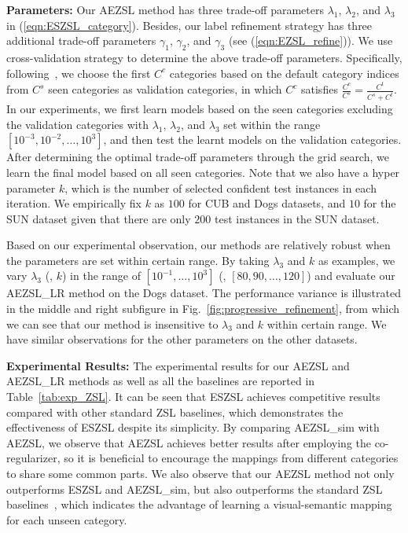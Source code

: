\documentclass[journal]{IEEEtran}
\begin{document}
\noindent\textbf{Parameters:} Our AEZSL method has three trade-off parameters $\lambda_1$, $\lambda_2$, and $\lambda_3$ in (\ref{eqn:ESZSL_category}). Besides, our label refinement strategy has three additional trade-off parameters $\gamma_1$, $\gamma_2$, and $\gamma_3$ (see (\ref{eqn:EZSL_refine})). We use cross-validation strategy to determine the above trade-off parameters.
Specifically, following~\cite{shojaee2016semi},  we choose the first $C^c$ categories based on the default category indices from $C^s$ seen categories as validation categories, in which $C^c$ satisfies $\frac{C^c}{C^s}=\frac{C^t}{C^s+C^t}$. In our experiments, we first learn models based on the seen categories excluding the validation categories with $\lambda_1$, $\lambda_2$, and $\lambda_3$ set within the range $[10^{-3},10^{-2},\ldots,10^{3}]$, and then test the learnt models on the validation categories. After determining the optimal trade-off parameters through the grid search, we learn the final model based on all seen categories.  
Note that we also have a hyper parameter $k$, which is the number of selected confident test instances in each iteration. We empirically fix $k$ as $100$ for CUB and Dogs datasets, and $10$ for the SUN dataset given that there are only $200$ test instances in the SUN dataset. 

Based on our experimental observation, our methods are relatively robust when the parameters are set within certain range. By taking $\lambda_3$ and $k$ as examples, we vary $\lambda_3$ (\resp, $k$) in the range of $[10^{-1},\ldots, 10^3]$ (\resp, $[80, 90, \ldots, 120]$) and evaluate our AEZSL\_LR method on the Dogs dataset. The performance variance is illustrated in the middle and right subfigure in Fig.~\ref{fig:progressive_refinement}, from which we can see that our method is insensitive to $\lambda_3$ and $k$ within certain range. We have similar observations for the other parameters on the other datasets.

\noindent\textbf{Experimental Results:} The experimental results for our AEZSL and AEZSL\_LR methods as well as all the baselines are reported in Table~\ref{tab:exp_ZSL}. 
It can be seen that ESZSL achieves competitive results compared with other standard ZSL baselines, which demonstrates the effectiveness of ESZSL despite its simplicity. By comparing AEZSL\_sim with AEZSL, we observe that AEZSL achieves better results after employing the co-regularizer, so it is beneficial to encourage the mappings from different categories to share some common parts. We also observe that our AEZSL method not only outperforms ESZSL and AEZSL\_sim, but also outperforms the standard ZSL baselines~\cite{xian2016latent,zhang2016zerose,bucher2016improving,fu2015zero,mensink2014costa,zhang2015zero,
akata2015evaluation,lampert2014attribute,changpinyo2016synthesized,
norouzi2013zero,wang2016relational,changpinyo2016predicting}, which indicates the advantage of learning a visual-semantic mapping for each unseen category.  
\end{document}

